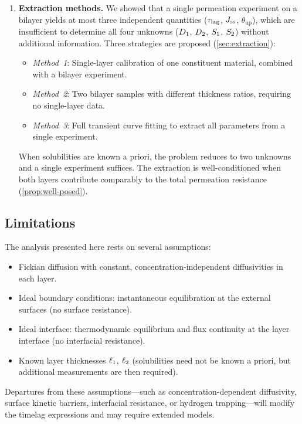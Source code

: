 \begin{enumerate}
  \item \textbf{Extraction methods.}
    We showed that a single permeation experiment on a bilayer yields at most
    three independent quantities ($\tau_{\mathrm{lag}}$, $J_{\mathrm{ss}}$, $\theta_{\mathrm{up}}$),
    which are insufficient to determine all four unknowns ($D_{1}$, $D_{2}$,
    $S_{1}$, $S_{2}$) without additional information.  Three strategies are
    proposed (\cref{sec:extraction}):
    \begin{itemize}
      \item \emph{Method~1}: Single-layer calibration of one constituent
            material, combined with a bilayer experiment.
      \item \emph{Method~2}: Two bilayer samples with different thickness
            ratios, requiring no single-layer data.
      \item \emph{Method~3}: Full transient curve fitting to extract all
            parameters from a single experiment.
    \end{itemize}
    When solubilities are known a priori, the problem reduces to two unknowns
    and a single experiment suffices.
    The extraction is well-conditioned when both layers contribute comparably
    to the total permeation resistance (\cref{prop:well-posed}).
\end{enumerate}

\subsection{Limitations}

The analysis presented here rests on several assumptions:
\begin{itemize}
  \item Fickian diffusion with constant, concentration-independent diffusivities
        in each layer.
  \item Ideal boundary conditions: instantaneous equilibration at the external
        surfaces (no surface resistance).
  \item Ideal interface: thermodynamic equilibrium and flux continuity at the
        layer interface (no interfacial resistance).
  \item Known layer thicknesses $\ell_{1}$, $\ell_{2}$ (solubilities need not be
        known a priori, but additional measurements are then required).
\end{itemize}
Departures from these assumptions---such as concentration-dependent
diffusivity, surface kinetic barriers, interfacial resistance, or hydrogen
trapping---will modify the timelag expressions and may require extended
models.

